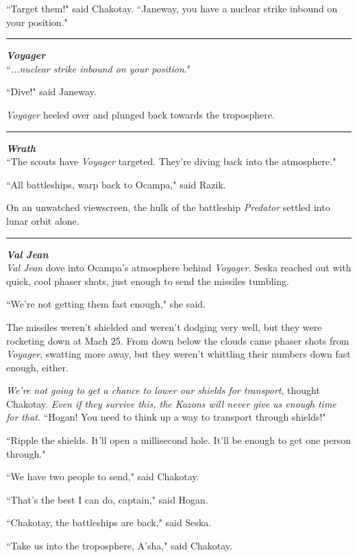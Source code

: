 \documentclass[twoside,letterpaper,12pt]{memoir}
\begin{document}
``Target them!" said Chakotay. ``Janeway, you have a nuclear strike inbound on your position."

\fancybreak{\rule{3cm}{0.4 pt}}
\noindent\textit{\textbf{Voyager}}\\

``\textit{...nuclear strike inbound on your position}."

``Dive!" said Janeway.

\textit{Voyager} heeled over and plunged back towards the troposphere.

\fancybreak{\rule{3cm}{0.4 pt}}
\noindent\textit{\textbf{Wrath}}\\

``The scouts have \textit{Voyager} targeted. They're diving back into the atmosphere."

``All battleships, warp back to Ocampa," said Razik.

On an unwatched viewscreen, the hulk of the battleship \textit{Predator} settled into lunar orbit alone.

\fancybreak{\rule{3cm}{0.4 pt}}
\noindent\textit{\textbf{Val Jean}}\\

\textit{Val Jean} dove into Ocampa's atmosphere behind \textit{Voyager}. Seska reached out with quick, cool phaser shots, just enough to send the missiles tumbling.

``We're not getting them fast enough," she said.

The missiles weren't shielded and weren't dodging very well, but they were rocketing down at Mach 25. From down below the clouds came phaser shots from \textit{Voyager}, swatting more away, but they weren't whittling their numbers down fast enough, either.

\textit{We're not going to get a chance to lower our shields for transport}, thought Chakotay. \textit{Even if they survive this, the Kazons will never give us enough time for that}. ``Hogan! You need to think up a way to transport through shields!"

``Ripple the shields. It'll open a millisecond hole. It'll be enough to get one person through."

``We have two people to send," said Chakotay.

``That's the best I can do, captain," said Hogan.

``Chakotay, the battleships are back," said Seska.

``Take us into the troposphere, A'sha," said Chakotay.
\end{document}

